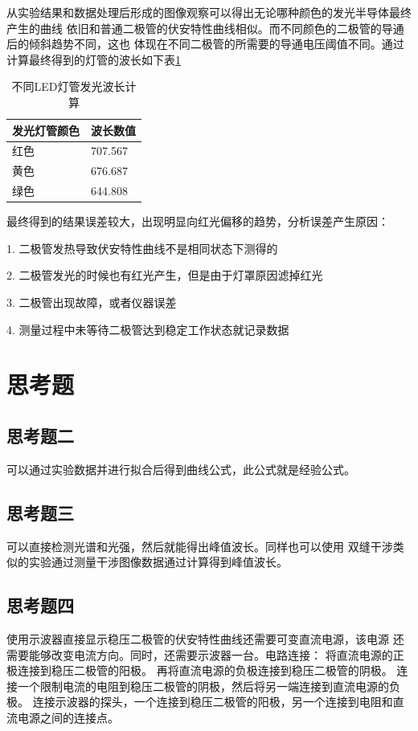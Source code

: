 \documentclass{ctexart}
\begin{document}
  从实验结果和数据处理后形成的图像观察可以得出无论哪种颜色的发光半导体最终产生的曲线
  依旧和普通二极管的伏安特性曲线相似。而不同颜色的二极管的导通后的倾斜趋势不同，这也
  体现在不同二极管的所需要的导通电压阈值不同。通过计算最终得到的灯管的波长如下表\ref{bochang}

  \begin{table}[h]
    \centering   
    \caption{不同LED灯管发光波长计算}\label{bochang}
    \begin{tabular}{| l || l |}
        \hline
        发光灯管颜色 & 波长数值\\
        \hline
        红色 & 707.567 \\
        \hline
        黄色 & 676.687 \\
        \hline
        绿色 & 644.808 \\
        \hline
    \end{tabular}
  \end{table}

  最终得到的结果误差较大，出现明显向红光偏移的趋势，分析误差产生原因：

  1.  二极管发热导致伏安特性曲线不是相同状态下测得的

  2.  二极管发光的时候也有红光产生，但是由于灯罩原因滤掉红光

  3.  二极管出现故障，或者仪器误差

  4.  测量过程中未等待二极管达到稳定工作状态就记录数据

\section{思考题}
  \subsection{思考题二}
  可以通过实验数据并进行拟合后得到曲线公式，此公式就是经验公式。
  \subsection{思考题三}
  可以直接检测光谱和光强，然后就能得出峰值波长。同样也可以使用
  双缝干涉类似的实验通过测量干涉图像数据通过计算得到峰值波长。
  \subsection{思考题四}
  使用示波器直接显示稳压二极管的伏安特性曲线还需要可变直流电源，该电源
  还需要能够改变电流方向。同时，还需要示波器一台。电路连接：
  将直流电源的正极连接到稳压二极管的阳极。
  再将直流电源的负极连接到稳压二极管的阴极。
  连接一个限制电流的电阻到稳压二极管的阴极，然后将另一端连接到直流电源的负极。
  连接示波器的探头，一个连接到稳压二极管的阳极，另一个连接到电阻和直流电源之间的连接点。
\end{document}
